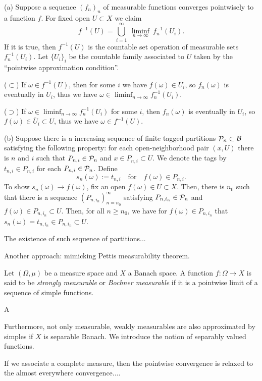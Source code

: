 \documentclass[a4paper]{article}
\begin{document}
\begin{pf}
(a)
Suppose a sequence $(f_n)_n$ of measurable functions converges pointwisely to a function $f$.
For fixed open $U\subset X$ we claim
\[f^{-1}(U)=\bigcup_{i=1}^\infty\ \liminf_{n\to\infty}\ f_n^{-1}(U_i).\]
If it is true, then $f^{-1}(U)$ is the countable set operation of measurable sets $f_n^{-1}(U_i)$.
Let $\{U_i\}_i$ be the countable family associated to $U$ taken by the ``pointwise approximation condition''.

($\subset$) If $\omega\in f^{-1}(U)$, then for some $i$ we have $f(\omega)\in U_i$, so $f_n(\omega)$ is eventually in $U_i$, thus we have $\omega\in\liminf_{n\to\infty}f_n^{-1}(U_i)$.

($\supset$) If $\omega\in\liminf_{n\to\infty}f_n^{-1}(U_i)$ for some $i$, then $f_n(\omega)$ is eventually in $U_i$, so $f(\omega)\in\bar U_i\subset U$, thus we have $\omega\in f^{-1}(U)$.

(b)
Suppose there is a increasing sequence of finite tagged partitions $\mathcal{P}_n\subset\mathcal{B}$ satisfying the following property: for each open-neighborhood pair $(x,U)$ there is $n$ and $i$ such that $P_{n,i}\in\mathcal{P}_n$ and $x\in P_{n,i}\subset U$.
We denote the tags by $t_{n,i}\in P_{n,i}$ for each $P_{n,i}\in\mathcal{P}_n$.
Define
\[s_n(\omega):=t_{n,i}\quad\text{for}\quad f(\omega)\in P_{n,i}.\]
To show $s_n(\omega)\to f(\omega)$, fix an open $f(\omega)\in U\subset X$.
Then, there is $n_0$ such that there is a sequence $(P_{n,i_n})_{n=n_0}^\infty$ satisfying $P_{n,i_n}\in\mathcal{P}_n$ and $f(\omega)\in P_{n,i_n}\subset U$.
Then, for all $n\ge n_0$, we have for $f(\omega)\in P_{n,i_n}$ that $s_n(\omega)=t_{n,i_n}\in P_{n,i_n}\subset U$.

The existence of such sequence of partitions...

Another approach: mimicking Pettis measurability theorem.

\end{pf}

\begin{prb}
Let $(\Omega,\mu)$ be a measure space and $X$ a Banach space.
A function $f:\Omega\to X$ is said to be \emph{strongly measurable} or \emph{Bochner measurable} if it is a pointwise limit of a sequence of simple functions.

\begin{parts}
\item A
\end{parts}
\end{prb}


\begin{prb}
Furthermore, not only measurable, weakly measurables are also approximated by simples if $X$ is separable Banach.
We introduce the notion of separably valued functions.

If we associate a complete measure, then the pointwise convergence is relaxed to the almost everywhere convergence....
\end{prb}
\end{document}
